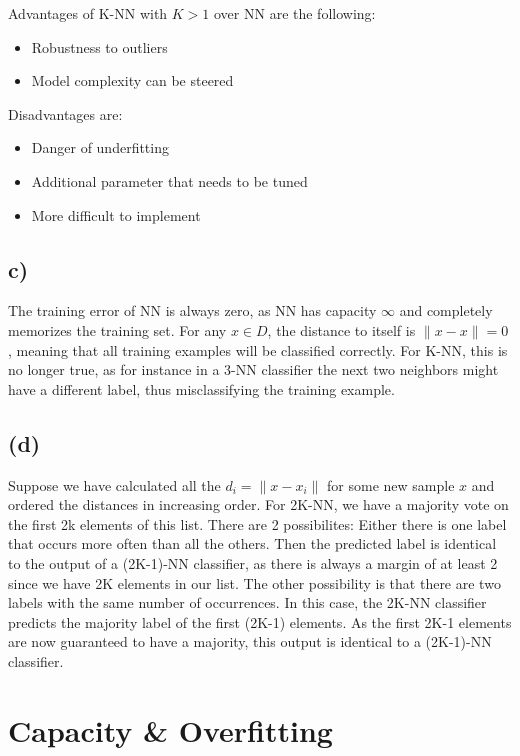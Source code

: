 \documentclass{scrartcl}
\begin{document}
Advantages of K-NN with $K > 1$ over NN are the following:
\begin{itemize}
  \item Robustness to outliers
  \item Model complexity can be steered
\end{itemize}

Disadvantages are:
\begin{itemize}
  \item Danger of underfitting
  \item Additional parameter that needs to be tuned
  \item More difficult to implement
\end{itemize}

\subsection{c)}
The training error of NN is always zero, as NN has capacity $\infty$ and completely memorizes the training set.
For any $x \in D$, the distance to itself is $\lVert x - x\rVert = 0$, meaning that all training examples will be
classified correctly.
For K-NN, this is no longer true, as for instance in a 3-NN classifier the next two neighbors might have a different label, thus misclassifying the training example.

\subsection{(d)}
Suppose we have calculated all the $d_i = \lVert x - x_i \rVert$ for some new sample $x$
and ordered the distances in increasing order.
For 2K-NN, we have a majority vote on the first 2k elements of this list.
There are 2 possibilites: Either there is one label that occurs more often than all the others.
Then the predicted label is identical to the output of a (2K-1)-NN classifier,
as there is always a margin of at least 2 since we have 2K elements in our list.
The other possibility is that there are two labels with the same number of occurrences.
In this case, the 2K-NN classifier predicts the majority label of the first (2K-1) elements.
As the first 2K-1 elements are now guaranteed to have a majority, this output is identical to a (2K-1)-NN
classifier. 

\section{Capacity \& Overfitting}
\end{document}
